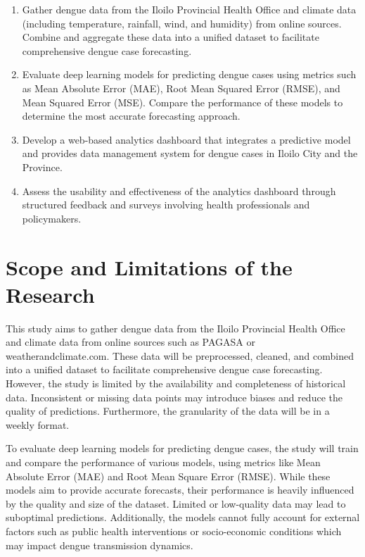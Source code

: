 \begin{enumerate}
	\item Gather dengue data from the Iloilo Provincial Health Office and climate data (including temperature, rainfall, wind, and humidity) from online sources. Combine and aggregate these data into a unified dataset to facilitate comprehensive dengue case forecasting.
	\item Evaluate deep learning models for predicting dengue cases using metrics such as Mean Absolute Error (MAE), Root Mean Squared Error (RMSE), and Mean Squared Error (MSE). Compare the performance of these models to determine the most accurate forecasting approach.
	\item Develop a web-based analytics dashboard that integrates a predictive model and provides data management  system for dengue cases in  Iloilo City and the Province.
	\item Assess the usability and effectiveness of the analytics dashboard through structured feedback and surveys involving health professionals and policymakers.
\end{enumerate}


\section{Scope and Limitations of the Research}
\label{sec:scopelimitations}

This study aims to gather dengue data from the Iloilo Provincial Health Office and climate data from online sources such as PAGASA or weatherandclimate.com. These data will be preprocessed, cleaned, and combined into a unified dataset to facilitate comprehensive dengue case forecasting. However, the study is limited by the availability and completeness of historical data. Inconsistent or missing data points may introduce biases and reduce the quality of predictions. Furthermore, the granularity of the data will be in a weekly format.

To evaluate deep learning models for predicting dengue cases, the study will train and compare the performance of various models, using metrics like Mean Absolute Error (MAE) and Root Mean Square Error (RMSE). While these models aim to provide accurate forecasts, their performance is heavily influenced by the quality and size of the dataset. Limited or low-quality data may lead to suboptimal predictions. Additionally, the models cannot fully account for external factors such as public health interventions or socio-economic conditions which may impact dengue transmission dynamics.

